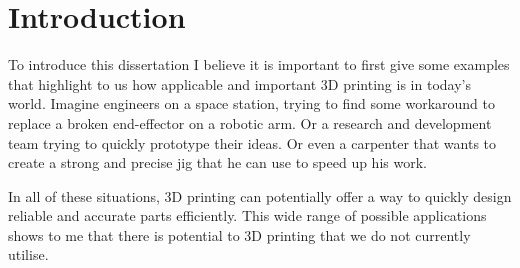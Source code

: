 \documentclass{l4proj}
\begin{document}
%
%
%
%
%
%
%
%
\chapter{Introduction}


To introduce this dissertation I believe it is important to first give some examples that highlight to us how applicable and important 3D printing is in today's world. Imagine engineers on a space station, trying to find some workaround to replace a broken end-effector on a robotic arm. Or a research and development team trying to quickly prototype their ideas. Or even a carpenter that wants to create a strong and precise jig that he can use to speed up his work. 

In all of these situations, 3D printing can potentially offer a way to quickly design reliable and accurate parts efficiently. This wide range of possible applications shows to me that there is potential to 3D printing that we do not currently utilise.  
\end{document}
